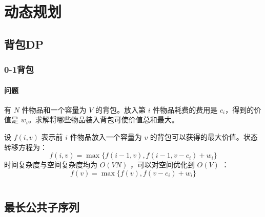 \documentclass[a4paper, twoside]{article}
\begin{document}

    



\newpage
\section{动态规划}
\subsection{背包DP}
    \subsubsection{0-1背包}
    \paragraph{问题}有 $N$ 件物品和一个容量为 $V$ 的背包。放入第 $i$ 件物品耗费的费用是 $c_i$，得到的价值是 $w_i$。求解将哪些物品装入背包可使价值总和最大。

    设 $f(i, v)$ 表示前 $i$ 件物品放入一个容量为 $v$ 的背包可以获得的最大价值。状态转移方程为：
    $$f(i, v)=\max\{f(i-1, v), f(i-1, v-c_i)+ w_i\}$$
    时间复杂度与空间复杂度均为 $O(VN)$ ，可以对空间优化到 $O(V)$ ：
    $$f(v)=\max\{f(v), f(v-c_i)+w_i\}$$
    \inputminted{cpp}{../src/动态规划/0-1背包.cpp}

\subsection{最长公共子序列}
\end{document}
